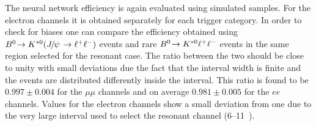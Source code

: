 The neural network efficiency is again evaluated using simulated samples. 
For the electron channels it is obtained separately for each trigger category.
%
In order to check for biases one can compare the efficiency obtained using
$\decay{\Bz}{\Kstarz(\jpsi\to\ll)}$ events and rare ${{B}^0}\!\rightarrow {\ensuremath{{K}^{*0}}} \ell^+ \ell^-$ events
in the same \qsq region selected for the resonant case. The ratio between the two should
be close to unity with small deviations due the fact that the \qsq interval width is finite and the events
are distributed differently inside the interval. This ratio is found to be $ 0.997  \pm  0.004 $ for the
$\mu\mu$ channels and on average $0.981  \pm  0.005$ for the $ee$ channels.
Values for the electron channels show a small deviation from one due to the very large
\qsq interval used to select the resonant channel (6--11~\gevgevcccc).











